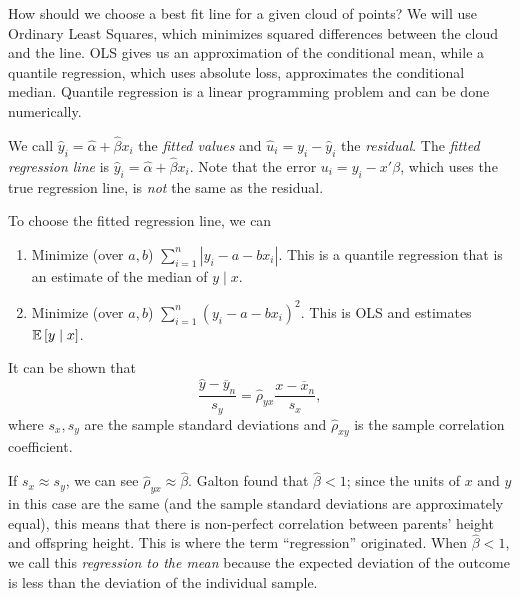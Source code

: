 How should we choose a best fit line for a given cloud of points? We will use Ordinary Least Squares, which minimizes squared differences between the cloud and the line. OLS gives us an approximation of the conditional mean, while a quantile regression, which uses absolute loss, approximates the conditional median. Quantile regression is a linear programming problem and can be done numerically.

We call $\hat{y}_i = \hat{\alpha} + \hat{\beta}x_i$ the \emph{fitted values} and $\hat{u}_i = y_i - \hat{y}_i$ the \emph{residual}. The \emph{fitted regression line} is $\hat{y}_i = \hat{\alpha} + \hat{\beta}x_i$. Note that the error $u_i = y_i - x' \beta$, which uses the true regression line, is \emph{not} the same as the residual.

To choose the fitted regression line, we can
\begin{enumerate}[label=(\roman*)]
	\item Minimize (over $a,b$) $\sum_{i=1}^{n} \left| y_i - a- b x_i \right|$. This is a quantile regression that is an estimate of the median of $y \mid x$.
	\item Minimize (over $a,b$) $\sum_{i=1}^{n} \left( y_i - a - bx_i \right)^2$. This is OLS and estimates $\mathbb{E}\left[y\mid x\right]$.
\end{enumerate}

It can be shown that \[
	\frac{\hat{y} - \overline{y}_n}{s_y} = \hat{\rho}_{yx} \frac{x - \overline{x}_n}{s_x}
	,\] where $s_x, s_y$ are the sample standard deviations and $\hat{\rho}_{xy}$ is the sample correlation coefficient.

If $s_x \approx s_y$, we can see $\hat{\rho}_{yx} \approx \hat{\beta}$. Galton found that $\hat{\beta} < 1$; since the units of $x$ and $y$ in this case are the same (and the sample standard deviations are approximately equal), this means that there is non-perfect correlation between parents' height and offspring height. This is where the term ``regression'' originated. When $\hat{\beta} < 1$, we call this \emph{regression to the mean} because the expected deviation of the outcome is less than the deviation of the individual sample.


\newpage
